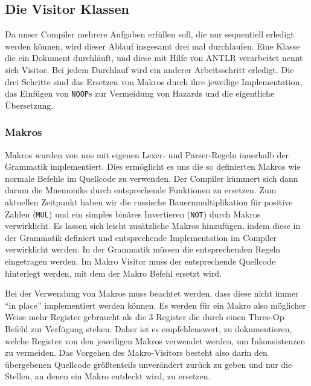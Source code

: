 \documentclass[paper=a4,fontsize=11pt,twocolumn]{scrreprt}
\begin{document}
\subsection{Die Visitor Klassen}
\label{subsec:die_visitor_klassen}
Da unser Compiler mehrere Aufgaben erfüllen soll, die nur sequentiell erledigt werden können, wird dieser Ablauf insgesamt drei mal durchlaufen.
Eine Klasse die ein Dokument durchläuft, und diese mit Hilfe von ANTLR verarbeitet nennt sich Visitor.
Bei jedem Durchlauf wird ein anderer Arbeitsschritt erledigt.
Die drei Schritte sind das Ersetzen von Makros durch ihre jeweilige Implementation, das Einfügen von \texttt{NOOP}s zur Vermeidung von Hazards und die eigentliche Übersetzung.

\subsubsection{Makros}
Makros wurden von uns mit eigenen Lexer- und Parser-Regeln innerhalb der Grammatik implementiert.
Dies ermöglicht es uns die so definierten Makros wie normale Befehle im Quellcode zu verwenden.
Der Compiler kümmert sich dann darum die Mnemoniks durch entsprechende Funktionen zu ersetzen.
Zum aktuellen Zeitpunkt haben wir die russische Bauernmultiplikation für positive Zahlen (\texttt{MUL}) und ein simples binäres Invertieren (\texttt{NOT}) durch Makros verwirklicht.
Es lassen sich leicht zusätzliche Makros hinzufügen, indem diese in der Grammatik definiert und entsprechende Implementation im Compiler verwirklicht werden.
In der Grammatik müssen die entsprechenden Regeln eingetragen werden. Im Makro Visitor muss der entsprechende Quellcode hinterlegt werden, mit dem der Makro Befehl ersetzt wird.

Bei der Verwendung von Makros muss beachtet werden, dass diese nicht immer \enquote{in place} implementiert werden können.
Es werden für ein Makro also möglicher Weise mehr Register gebraucht als die 3 Register die durch einen Three-Op Befehl zur Verfügung stehen.
Daher ist es empfehlenswert, zu dokumentieren, welche Register von den jeweiligen Makros verwendet werden, um Inkonsistenzen zu vermeiden.
Das Vorgehen des Makro-Visitors besteht also darin den übergebenen Quellcode größtenteils unverändert zurück zu geben und nur die Stellen, an denen ein Makro entdeckt wird, zu ersetzen.
\end{document}
